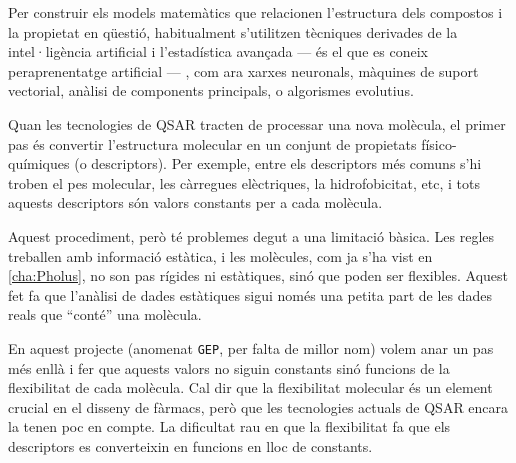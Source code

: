 %
Per construir els models matemàtics que relacionen l’estructura dels compostos i
la propietat en qüestió, habitualment s'utilitzen tècniques derivades de la
intel·ligència artificial i l’estadística avançada — és el que es coneix
peraprenentatge artificial — , com ara xarxes neuronals, màquines de suport
vectorial, anàlisi de components principals, o algorismes evolutius.

%
Quan les tecnologies de QSAR tracten de processar una nova molècula, el primer
pas és convertir l’estructura molecular en un conjunt de propietats
físico-químiques (o descriptors). Per exemple, entre els descriptors més comuns
s’hi troben el pes molecular, les càrregues elèctriques, la hidrofobicitat, etc,
i tots aquests descriptors són valors constants per a cada molècula.

Aquest procediment, però té problemes degut a una limitació bàsica.  Les regles
treballen amb informació estàtica, i les molècules, com ja s'ha vist en
\ref{cha:Pholus}, no son pas rígides ni estàtiques, sinó que poden ser
flexibles.  Aquest fet fa que l'anàlisi de dades estàtiques sigui només una
petita part de les dades reals que ``conté'' una molècula.

En aquest projecte (anomenat \texttt{GEP}, per falta de millor nom) volem anar
un pas més enllà i fer que aquests valors no siguin constants sinó funcions de
la flexibilitat de cada molècula.  Cal dir que la flexibilitat molecular és un
element crucial en el disseny de fàrmacs, però que les tecnologies actuals de
QSAR encara la tenen poc en compte. La dificultat rau en que la flexibilitat fa
que els descriptors es converteixin en funcions en lloc de constants.


